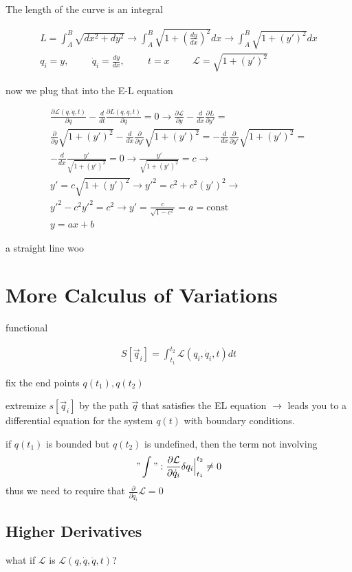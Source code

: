 \documentclass[fleqn]{report}
\newcommand{\hp}{\hspace{1cm}}
\newcommand{\const}{\textrm{const}}
\newcommand{\del}{\partial}
\newcommand{\equations} [1] {
\begin{gather*}
#1
\end{gather*}
}
\begin{document}
The length of the curve is an integral 
\equations{
    L = \int^B_A \sqrt{dx^2 + dy^2}
    \rightarrow  
    \int^B_A \sqrt{1 + (\frac{dy}{dx})^2} dx
    \rightarrow  
    \int^B_A \sqrt{1 + (y')^2} dx
    \\
    q_i = y, \hp \dot q_i = \frac{dy}{dx}, \hp t = x
    \hp 
    \mathcal L = 
    \sqrt{1 + (y')^2}
}
now we plug that into the E-L equation 
\equations{
    \frac{\del \mathcal L(q, \dot q, t)}{\del q} - 
    \frac{d}{dt} \frac{\del L(q, \dot q, t)}{\del \dot q} = 0
    \rightarrow 
    \frac{\del \mathcal L}{\del y} - 
    \frac{d}{dx} \frac{\del L}{\del y'} 
    =
    \\
    \frac{\del}{\del y}
    \sqrt{1 + (y')^2}
    -
    \frac{d}{dx} \frac{\del}{\del y'}  
    \sqrt{1 + (y')^2}
    =
    -
    \frac{d}{dx} \frac{\del}{\del y'}  
    \sqrt{1 + (y')^2}
    =
    \\
    -
    \frac{d}{dx} 
    \frac{y'}{\sqrt{1 + (y')^2}}
    = 0
    \rightarrow 
    \frac{y'}{\sqrt{1 + (y')^2}}
    = c
    \rightarrow 
    \\
    y'
    = c \sqrt{1 + (y')^2}
    \rightarrow 
    y'^2
    = c^2 + c^2 (y')^2
    \rightarrow 
    \\
    y'^2 - c^2 y'^2
    = c^2 
    \rightarrow
    y' = \frac{c}{\sqrt{1 - c^2}}
    = a = \const
    \\
    y = ax + b
}
a straight line woo 

\section{More Calculus of Variations}
functional 
\equations{
    S[\vec q_i]
    =
    \int^{t_2}_{t_1}
    \mathcal L(q_i, \dot q_i, t)
    dt 
}
fix the end points $q(t_1), q(t_2)$

extremize $s[\vec q_i]$ by the path $\vec q$ that 
satisfies the EL equation $\rightarrow$ leads you to 
a differential equation for the system $q(t)$ with boundary conditions.

if $q(t_1)$ is bounded but $q(t_2)$ is undefined, then 
the term not involving 
\[
"\int" : \frac{\del \mathcal L}{\del \dot q_i} 
\delta q_i \Big|^{t_2}_{t_1} \neq 0
\]
thus we need to require that $\frac{\del}{\del \dot q_i} \mathcal L = 0$

\subsection{Higher Derivatives}
what if $\mathcal L$ is $\mathcal L(q, \dot q, \ddot q, t)$?
\end{document}
